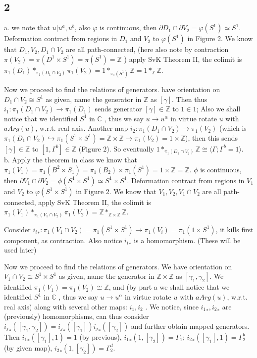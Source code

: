 \documentclass[11pt]{article}
\def\Z{{\mathbb Z}}
\def\C{{\mathbb C}}
\theoremstyle{remark}
\begin{document}
\subsection*{2 }
\indent a. we note that $u|u^a,u^b$, also $\varphi$ is continuous, then $\partial D_1 \cap \partial V_2= \varphi(S^1) \simeq S^1$. Deformation contract from regions in $D_1$ and $V_2$ to  $\varphi(S^1)$ in Figure 2. We know that $D_1, V_2, D_1 \cap V_2$ are all path-connected, (here also note by contraction $\pi(V_2)=\pi(D^1\times S^1)=\pi(S^1)=\Z$ ) apply SvK Theorem II, the colimit is $\pi_1(D_1)*_{\pi_1(D_1\cap V_2)}\pi_1(V_2)=1*_{\pi_1(S^1)} \Z =1*_{\Z} \Z $.

Now we proceed to find the relations of generators.  have orientation on $D_1\cap V_2\cong S^1$ as given, name the generator in $\Z$ as $[\gamma]$. Then thus $i_1:\pi_1(D_1\cap V_2) \rightarrow \pi_1(D_1) $ sends generator $[\gamma]\in \Z \textrm{ to } 1 \in 1$; Also we shall notice that we identified $S^1$ in $\C$ , thus we say $u\rightarrow u^{\alpha}$ in virtue rotate $u$ with $a Arg(u)$, w.r.t. real axis. Another map $i_2:\pi_1(D_1\cap V_2) \rightarrow \pi_1(V_2) $ (which is $\pi_1(D_1\cap V_2) \hookrightarrow  \pi_1(S^1\times S^1)=\Z \times \Z \rightarrow \pi_1(V_2)=1 \times \Z$), then this sends $[\gamma]\in \Z \textrm{ to } [1,\Gamma^b] \in \Z$ (Figure $2$).  So eventually $1*_{\pi_1(D_1\cap V_2)}\Z \cong \langle \Gamma ; \Gamma^b=1\rangle$. \\  

b. Apply the theorem in class we know that $\pi_1(V_1)=\pi_1(B^2\times S_1)=\pi_1(B_2)\times \pi_1(S^1)=1\times \Z =\Z$.
$\phi$ is continuous, then $\partial V_1 \cap \partial V_2= \phi(S^1\times S^1) \simeq S^1\times S^1$. Deformation contract from regions in $V_1$ and $V_2$ to  $\varphi(S^1\times S^1)$ in Figure 2. We know that $V_1, V_2, V_1 \cap V_2$ are all path-connected, apply SvK Theorem II, the colimit is $\pi_1(V_1)*_{\pi_1(V_1\cap V_2)}\pi_1(V_2)=\Z*_{\Z\times \Z} \Z$. 

Consider ${i_i}_*:\pi_1(V_1\cap V_2)=\pi_1(S^1\times S^1) \rightarrow \pi_1(V_i)=\pi_1(1\times S^1) $, it kills first component, as contraction. Also notice ${i_i}_*$ is a homomorphism. (These will be used later)  

Now we proceed to find the relations of generators. We have orientation on $V_1\cap V_2\cong S^1{\times} S^1$ as given, name the generator in $\Z \times \Z$ as $[\gamma_1,\gamma_2]$. We identified $\pi_1(V_1)=\pi_1(V_2)\cong \Z$, and (by part a  we shall notice that we identified $S^1$ in $\C$ , thus we say $u\rightarrow u^{\alpha}$ in virtue rotate $u$ with $a Arg(u)$, w.r.t. real axis) along with several other maps: ${i_1},{i_2}$ . We notice, since ${i_1}_*,{i_2}_*$ are (previously) homomorphisms, can thus consider ${i_j}_*([\gamma_1,\gamma_2])={i_j}_*([\gamma_1]){i_j}_*([\gamma_2]) $ and further obtain mapped generators. Then ${i_1}_*([\gamma_1],1)=1$ (by previous), ${i_1}_*(1,[\gamma_2])=\Gamma_1$; ${i_2}_*([\gamma_1],1)=\Gamma_2^b$ (by given map), ${i_2}_*(1,[\gamma_2])=\Gamma_2^d$.
\end{document}
